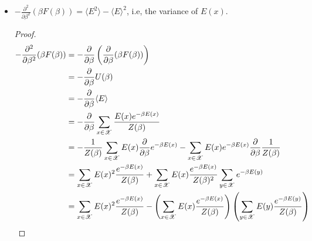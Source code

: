 \documentclass[letterpaper,english,12pt]{article}
\begin{document}
\begin{lem}
\begin{itemize}
\begin{proof}
\begin{align*}
	&= \log Z(\beta) - \frac{\beta^2}{\beta Z(\beta)} \sum_{x \in \sX} \frac{\partial}{\partial \beta} e^{-\beta E(x)}\\
	&= \log Z(\beta) + \beta \sum_{x \in \sX} E(x) \mu_\beta (x)
\end{align*}
Now,
\begin{align*}
\mu_\beta(x) &= \frac{e^{-\beta E(x)}}{Z(\beta)} \\
\implies \log \mu_\beta(x) &= - \beta E(x) - \log Z(\beta) \\
\implies \beta E(x) &= -\log \mu_\beta(x) - \log Z(\beta)
\end{align*}
Substituting this in the expression for $S(\beta)$, we obtain
\begin{align*}
S(\beta) &= \log Z(\beta) + \sum_{x \in \sX} (-\log \mu_\beta(x) - \log Z(\beta)) \mu_\beta(x) \\
	&= - \sum_{x \in \sX} \mu_\beta(x) \log \mu_\beta(x) \\
	&= \frac{H(\mu_\beta)}{\log 2},
\end{align*}
where $H(\mu_\beta)$ is the Shannon entropy of the Boltzmann distibution.
\end{proof}
\item $ - \frac{\partial^2}{\partial \beta^2} (\beta F(\beta)) = \langle E^2 \rangle - \langle E \rangle^2$, i.e, the variance of $E(x)$.
\begin{proof}
\begin{align*}
- \frac{\partial^2}{\partial \beta^2} (\beta F(\beta)) &= - \frac{\partial}{\partial \beta} \left( \frac{\partial}{\partial \beta} (\beta F(\beta)) \right) \\
	&= - \frac{\partial}{\partial \beta} U(\beta) \\
	&= - \frac{\partial}{\partial \beta} \langle E \rangle \\
	&= - \frac{\partial}{\partial \beta} \sum_{x \in \sX} \frac{E(x) e^{- \beta E(x)}}{Z(\beta)} \\
	&= -\frac{1}{Z(\beta)} \sum_{x \in \sX} E(x) \frac{\partial}{\partial \beta} e^{- \beta E(x)} - \sum_{x \in \sX} E(x) e^{- \beta E(x)} \frac{\partial}{\partial \beta} \frac{1}{Z(\beta)} \\
	&= \sum_{x \in \sX} E(x)^2 \frac{e^{- \beta E(x)}}{Z(\beta)} + \sum_{x \in \sX} E(x) \frac{e^{- \beta E(x)}}{Z(\beta)^2} \sum_{y \in \sX} e^{- \beta E(y)} \\
	&= \sum_{x \in \sX} E(x)^2 \frac{e^{- \beta E(x)}}{Z(\beta)} - \left( \sum_{x \in \sX} E(x) \frac{e^{- \beta E(x)}}{Z(\beta)} \right) \left( \sum_{y \in \sX} E(y) \frac{e^{- \beta E(y)}}{Z(\beta)} \right) \\

\end{align*}
\end{proof}
\end{itemize}
\end{lem}
\end{document}
